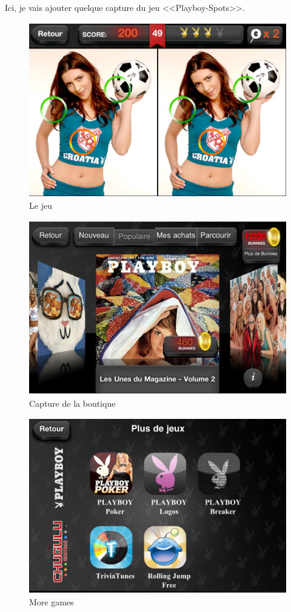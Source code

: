 \documentclass[twoside, UTF8]{EPURapport}
\begin{document}










\annexes

Ici, je vais ajouter quelque capture du jeu <<Playboy-Spots>>.
\begin{figure}[htbp]
	\centering
		\includegraphics[height=3in]{Image/Capture1.png}
	\caption{Le jeu}
	\label{fig:Image_Capture1}
\end{figure}
\begin{figure}[htbp]
	\centering
		\includegraphics[height=3in]{Image/Capture2.png}
	\caption{Capture de la boutique}
	\label{fig:Image_Capture2}
\end{figure}
\begin{figure}[htbp]
	\centering
		\includegraphics[height=3in]{Image/Capture3.png}
	\caption{More games}
	\label{fig:Image_Capture3}
\end{figure}
\end{document}
